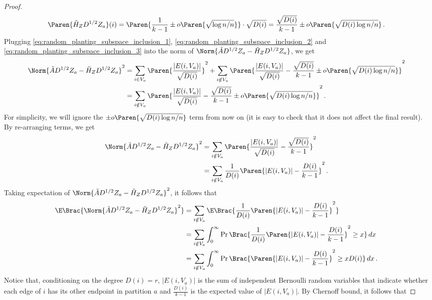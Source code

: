 \begin{proof}
\begin{equation}
        \Paren{\tilde{H}_Z  D^{1/2} Z_a}(i)
        = \Paren{\frac{1}{k-1} \pm o \Paren{\sqrt{\log n/n}}} \cdot \sqrt{D(i)}
        = \frac{\sqrt{D(i)}}{k-1} \pm o \Paren{\sqrt{D(i) \log n/n}} \,.
    \end{equation}
    Plugging \cref{eq:random_planting_subspace_inclusion_1}, \cref{eq:random_planting_subspace_inclusion_2} and \cref{eq:random_planting_subspace_inclusion_3} into the norm of $\Norm{\tilde{A} D^{1/2} Z_a - \tilde{H}_Z D^{1/2} Z_a}$, we get
    \begin{align*}
        \Norm{\tilde{A} D^{1/2} Z_a - \tilde{H}_Z D^{1/2} Z_a}^2
        & = \sum_{i \in V_a} \Paren{\frac{|E(i, V_a)|}{\sqrt{D(i)}}}^2 + \sum_{i \notin V_a} \Paren{\frac{|E(i, V_a)|}{\sqrt{D(i)}} - \frac{\sqrt{D(i)}}{k-1} \pm o \Paren{\sqrt{D(i) \log n/n}}}^2 \\
        & = \sum_{i \notin V_a} \Paren{\frac{|E(i, V_a)|}{\sqrt{D(i)}} - \frac{\sqrt{D(i)}}{k-1} \pm o \Paren{\sqrt{D(i) \log n/n}}}^2 \,.
    \end{align*}
    For simplicity, we will ignore the $\pm o \Paren{\sqrt{D(i) \log n/n}}$ term from now on (it is easy to check that it does not affect the final result). By re-arranging terms, we get
    \begin{align*}
        \Norm{\tilde{A} D^{1/2} Z_a - \tilde{H}_Z D^{1/2} Z_a}^2
        & = \sum_{i \notin V_a} \Paren{\frac{|E(i, V_a)|}{\sqrt{D(i)}} - \frac{\sqrt{D(i)}}{k-1}}^2 \\
        & = \sum_{i \notin V_a} \frac{1}{D(i)}\Paren{|E(i, V_a)| - \frac{D(i)}{k-1}}^2 \,.
    \end{align*}
    Taking expectation of $\Norm{\tilde{A} D^{1/2} Z_a - \tilde{H}_Z D^{1/2} Z_a}^2$, it follows that
    \begin{align*}
        \E \Brac{\Norm{\tilde{A} D^{1/2} Z_a - \tilde{H}_Z D^{1/2} Z_a}^2}
        & = \sum_{i \notin V_a} \E \Brac{\frac{1}{D(i)}\Paren{|E(i, V_a)| - \frac{D(i)}{k-1}}^2} \\
        & = \sum_{i \notin V_a} \int_{0}^{\infty} \Pr \Brac{\frac{1}{D(i)}\Paren{|E(i, V_a)| - \frac{D(i)}{k-1}}^2 \geq x} \,d x \\
        & = \sum_{i \notin V_a} \int_{0}^{\infty} \Pr \Brac{\Paren{|E(i, V_a)| - \frac{D(i)}{k-1}}^2 \geq x D(i)} \,d x \,.
    \end{align*}
    Notice that, conditioning on the degree $D(i)=r$, $|E(i, V_a)|$ is the sum of independent Bernoulli random variables that indicate whether each edge of $i$ has its other endpoint in partition $a$ and $\frac{D(i)}{k-1}$ is the expected value of $|E(i, V_a)|$. By Chernoff bound, it follows that

\end{proof}
